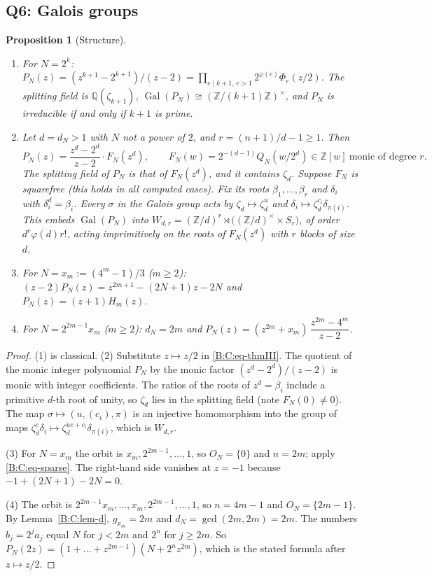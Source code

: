 \documentclass[11pt,a4paper]{article}
\newtheorem{proposition}[theorem]{Proposition}
\theoremstyle{definition}
\theoremstyle{remark}
\numberwithin{equation}{section}
\begin{document}
\subsection{Q6: Galois groups}\label{B:C:ssec-Q6}

\begin{proposition}[Structure]\label{B:C:prop-galstruct}
\leavevmode
\begin{enumerate}
\item For $N=2^k$: $P_N(z)=(z^{k+1}-2^{k+1})/(z-2)=\prod_{e\mid k+1,\,e>1}
2^{\varphi(e)}\Phi_e(z/2)$.  The splitting field is $\mathbb Q(\zeta_{k+1})$,
$\operatorname{Gal}(P_N)\cong(\mathbb Z/(k+1)\mathbb Z)^\times$, and $P_N$ is
irreducible if and only if $k+1$ is prime.
\item Let $d=d_N>1$ with $N$ not a power of $2$, and $r=(n+1)/d-1\ge1$.  Then
\[
P_N(z)=\frac{z^d-2^d}{z-2}\cdot F_N(z^d),\qquad
F_N(w)=2^{-(d-1)}Q_N(w/2^d)\in\mathbb Z[w]\ \text{monic of degree }r .
\]
The splitting field of $P_N$ is that of $F_N(z^d)$, and it contains $\zeta_d$.
Suppose $F_N$ is squarefree (this holds in all computed cases).
Fix its roots $\beta_1,\dots,\beta_r$ and $\delta_i$ with
$\delta_i^d=\beta_i$.  Every $\sigma$ in the Galois group acts by
$\zeta_d\mapsto\zeta_d^{u}$ and $\delta_i\mapsto\zeta_d^{c_i}\delta_{\pi(i)}$.
This embeds $\operatorname{Gal}(P_N)$ into
$W_{d,r}=(\mathbb Z/d)^r\rtimes\bigl((\mathbb Z/d)^\times\times S_r\bigr)$, of order
$d^r\varphi(d)r!$, acting imprimitively on the roots of $F_N(z^d)$ with $r$
blocks of size $d$.
\item For $N=x_m:=(4^m-1)/3$ ($m\ge2$): $(z-2)P_N(z)=z^{2m+1}-(2N+1)z-2N$ and
$P_N(z)=(z+1)H_m(z)$.
\item For $N=2^{2m-1}x_m$ ($m\ge2$): $d_N=2m$ and
$P_N(z)=(z^{2m}+x_m)\,\dfrac{z^{2m}-4^m}{z-2}$.
\end{enumerate}
\end{proposition}

\begin{proof}
(1) is classical.  (2) Substitute $z\mapsto z/2$ in \eqref{B:C:eq-thmIII}.  The
quotient of the monic integer polynomial $P_N$ by the monic factor
$(z^d-2^d)/(z-2)$ is monic with integer coefficients.  The ratios of the roots
of $z^d=\beta_i$ include a primitive $d$-th root of unity, so $\zeta_d$ lies in the
splitting field (note $F_N(0)\ne0$).  The map $\sigma\mapsto(u,(c_i),\pi)$ is an
injective homomorphism into the group of maps $\zeta_d^c\delta_i\mapsto
\zeta_d^{uc+c_i}\delta_{\pi(i)}$, which is $W_{d,r}$.

(3) For $N=x_m$ the orbit is $x_m,2^{2m-1},\dots,1$, so $O_N=\{0\}$ and $n=2m$;
apply \eqref{B:C:eq-sparse}.  The right-hand side vanishes at $z=-1$ because
$-1+(2N+1)-2N=0$.

(4) The orbit is $2^{2m-1}x_m,\dots,x_m,2^{2m-1},\dots,1$, so $n=4m-1$ and
$O_N=\{2m-1\}$.  By Lemma~\ref{B:C:lem-d}, $g_{x_m}=2m$ and $d_N=\gcd(2m,2m)=2m$.
The numbers $b_j=2^ja_j$ equal $N$ for $j<2m$ and $2^n$ for $j\ge2m$.  So
$P_N(2z)=(1+\dots+z^{2m-1})(N+2^nz^{2m})$, which is the stated formula after
$z\mapsto z/2$.
\end{proof}
\end{document}
